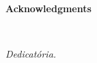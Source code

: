 %
%


\vspace*{2cm}
\begin{center}
\Large \bf Acknowledgments
\end{center}
\vspace*{1cm} \setlength{\baselineskip}{0.6cm}

\blindtext[3]

\LIMPA

~
\vfill

\begin{flushright}\textit{Dedicatória.}\end{flushright}

